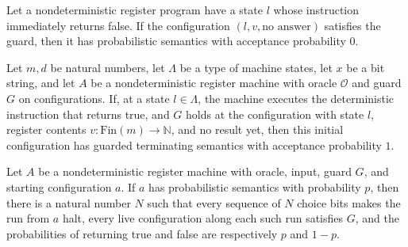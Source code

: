 \begin{lemma}
\label{Complexity.LogProg.PSem.rej}
\leanok
{}
Let a nondeterministic register program have a state $l$ whose instruction immediately
returns false. If the configuration $(l,v,\text{no answer})$ satisfies the guard, then it
has probabilistic semantics with acceptance probability $0$.
\end{lemma}

\begin{lemma}
\label{Complexity.LogProg.PSem.acc}
\leanok
{}
Let $m,d$ be natural numbers, let $\Lambda$ be a type of machine states, let $x$ be a
bit string, and let $A$ be a nondeterministic register machine with oracle $\mathcal O$
and guard $G$ on configurations. If, at a state $l\in\Lambda$, the machine executes the
deterministic instruction that returns true, and $G$ holds at the configuration with
state $l$, register contents $v\colon\mathrm{Fin}(m)\to\mathbb N$, and no result yet,
then this initial configuration has guarded terminating semantics with acceptance
probability $1$.
\end{lemma}

\begin{theorem}
\label{Complexity.LogProg.PSem.decides}
\leanok
{}
Let $A$ be a nondeterministic register machine with oracle, input, guard $G$, and
starting configuration $a$. If $a$ has probabilistic semantics with probability $p$,
then there is a natural number $N$ such that every sequence of $N$ choice bits makes the
run from $a$ halt, every live configuration along each such run satisfies $G$, and the
probabilities of returning true and false are respectively $p$ and $1-p$.
\end{theorem}


